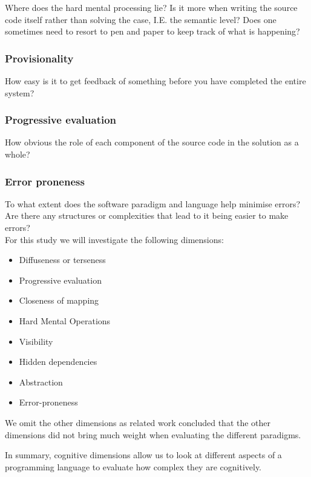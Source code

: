 \documentclass[12pt]{report}
\theoremstyle{definition}
\theoremstyle{theorem}
\begin{document}
Where does the hard mental processing lie? Is it more when writing the source
code itself rather than solving the case, I.E. the semantic level? Does one
sometimes need to resort to pen and paper to keep track of what is happening?

\subsubsection*{Provisionality}

How easy is it to get feedback of something before you have completed the entire
system?

\subsubsection*{Progressive evaluation}

How obvious the role of each component of the source code in the solution as a
whole?

\subsubsection*{Error proneness}

To what extent does the software paradigm and language help minimise errors? Are
there any structures or complexities that lead to it being easier to make
errors?~\cite{GREEN1996131}\\

\noindent For this study we will investigate the following dimensions: 

\begin{itemize}
    \item Diffuseness or terseness
    \item Progressive evaluation
    \item Closeness of mapping
    \item Hard Mental Operations
    \item Visibility
    \item Hidden dependencies
    \item Abstraction
    \item Error-proneness 
\end{itemize}

\noindent We omit the other dimensions as related work concluded that the other
dimensions did not bring much weight when evaluating the different
paradigms.~\cite{euguenkiss}

In summary, cognitive dimensions allow us to look at different aspects of a
programming language to evaluate how complex they are cognitively. 
\end{document}
